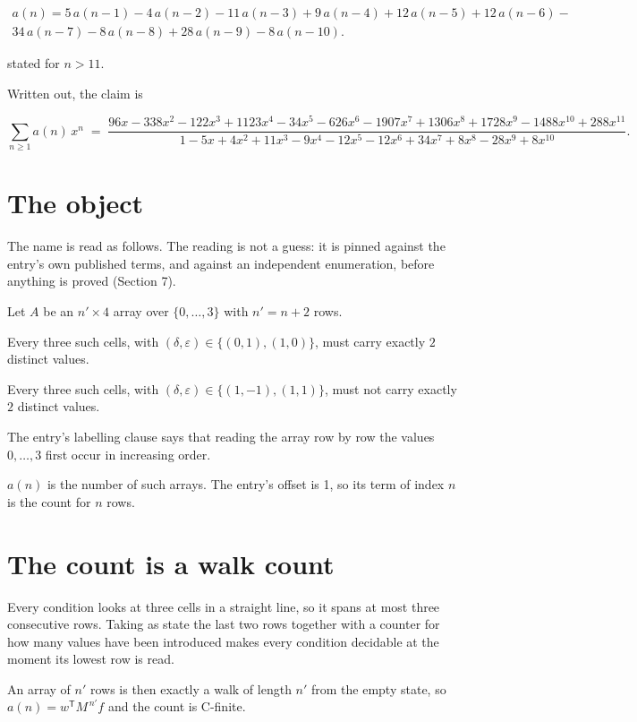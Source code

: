 \documentclass[11pt]{article}
\theoremstyle{definition}
\begin{document}
\begin{multline*} a(n) = 5\,a(n-1) - 4\,a(n-2) - 11\,a(n-3) + 9\,a(n-4) + 12\,a(n-5) + 12\,a(n-6) - \\ 34\,a(n-7) - 8\,a(n-8) + 28\,a(n-9) - 8\,a(n-10). \end{multline*}

stated for $n > 11$.

Written out, the claim is

\[\sum_{n \ge 1} a(n)\,x^n \;=\; \frac{96x - 338x^{2} - 122x^{3} + 1123x^{4} - 34x^{5} - 626x^{6} - 1907x^{7} + 1306x^{8} + 1728x^{9} - 1488x^{10} + 288x^{11}}{1 - 5x + 4x^{2} + 11x^{3} - 9x^{4} - 12x^{5} - 12x^{6} + 34x^{7} + 8x^{8} - 28x^{9} + 8x^{10}}.\]

\section{The object}

The name is read as follows. The reading is not a guess: it is pinned against the entry's own published terms, and against an independent enumeration, before anything is proved (Section 7).

Let $A$ be an $n' \times 4$ array over $\{0,\dots,3\}$ with $n' = n + 2$ rows.

Every three such cells, with $(\delta,\varepsilon) \in \{(0,1), (1,0)\}$, must carry exactly $2$ distinct values.

Every three such cells, with $(\delta,\varepsilon) \in \{(1,-1), (1,1)\}$, must not carry exactly $2$ distinct values.

The entry's labelling clause says that reading the array row by row the values $0,\dots,3$ first occur in increasing order.

$a(n)$ is the number of such arrays. The entry's offset is 1, so its term of index $n$ is the count for $n$ rows.

\section{The count is a walk count}

Every condition looks at three cells in a straight line, so it spans at most three consecutive rows. Taking as state the last two rows together with a counter for how many values have been introduced makes every condition decidable at the moment its lowest row is read.

An array of $n'$ rows is then exactly a walk of length $n'$ from the empty state, so $a(n) = w^{\mathsf T}M^{\,n'}f$ and the count is C-finite.
\end{document}
